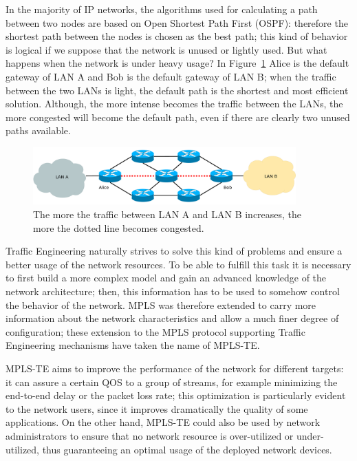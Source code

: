 \documentclass[10pt,a4paper]{report}
\begin{document}
In the majority of IP networks, the algorithms used for calculating a
path between two nodes are based on Open Shortest Path First (OSPF):
therefore the shortest path between the nodes is chosen as the best
path; this kind of behavior is logical if we suppose that the network
is unused or lightly used. But what happens when the network is under
heavy usage? In Figure~\ref{fig:mpls_te} Alice is the default gateway
of LAN A and Bob is the default gateway of LAN B; when the traffic
between the two LANs is light, the default path is the shortest and
most efficient solution. Although, the more intense becomes the
traffic between the LANs, the more congested will become the default
path, even if there are clearly two unused paths available.

\begin{figure}[!hbp]
  \centering
  \includegraphics[width=0.9\textwidth]{img/mpls_te}
  \caption[Traffic Engineering example]{The more the traffic between
    LAN A and LAN B increases, the more the dotted line becomes
    congested.}
  \label{fig:mpls_te}
\end{figure}

Traffic Engineering naturally strives to solve this kind of problems
and ensure a better usage of the network resources. To be able to
fulfill this task it is necessary to first build a more complex model
and gain an advanced knowledge of the network architecture; then, this
information has to be used to somehow control the behavior of the
network. MPLS was therefore extended to carry more information about
the network characteristics and allow a much finer degree of
configuration; these extension to the MPLS protocol supporting Traffic
Engineering mechanisms have taken the name of MPLS-TE.

MPLS-TE aims to improve the performance of the network for different
targets: it can assure a certain QOS to a group of streams, for
example minimizing the end-to-end delay or the packet loss rate; this
optimization is particularly evident to the network users, since it
improves dramatically the quality of some applications. On the other
hand, MPLS-TE could also be used by network administrators to ensure
that no network resource is over-utilized or under-utilized, thus
guaranteeing an optimal usage of the deployed network devices.
\end{document}
